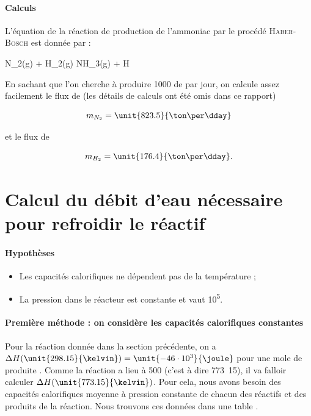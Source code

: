 \paragraph{Calculs}
L'équation de la réaction de production de l'ammoniac par le
procédé \textsc{Haber-Bosch} est donnée par :

	\begin{chemmath}
			N_2(g) + H_2(g) \longrightarrow NH_3(g) + \Delta H
 	\end{chemmath}
	
En sachant que l'on cherche à produire \unit{1000}{\ton} de  par jour, 
on calcule assez facilement le flux de  (les détails de calculs ont été omis
dans ce rapport)

	$$m_{N_2} = \unit{823.5}{\ton\per\dday}$$

et le flux de 

	$$m_{H_2} = \unit{176.4}{\ton\per\dday}.$$

\section{Calcul du débit d'eau nécessaire pour refroidir le réactif}
\paragraph{Hypothèses}
\begin{itemize}
	\item Les capacités calorifiques ne dépendent pas de la température ;
	\item La pression dans le réacteur est constante et vaut \unit{10^5}{\pascal}.
\end{itemize}

\paragraph{Première méthode : on considère les capacités calorifiques constantes}
Pour la réaction donnée dans la section précédente, on a $\Delta H(\unit{298.15}{\kelvin})
 = \unit{-46 \cdot 10^3}{\joule}$ pour une mole de  produite \cite{atkins}.
Comme la réaction a lieu à \unit{500}{\celsius} (c'est à dire \unit{773.15}{\kelvin}), il
va falloir calculer $\Delta H(\unit{773.15}{\kelvin})$. Pour cela, nous avons besoin
des capacités calorifiques moyenne à pression constante de chacun des réactifs et des produits
de la réaction. Nous trouvons ces données dans une table \cite{atkins}.

